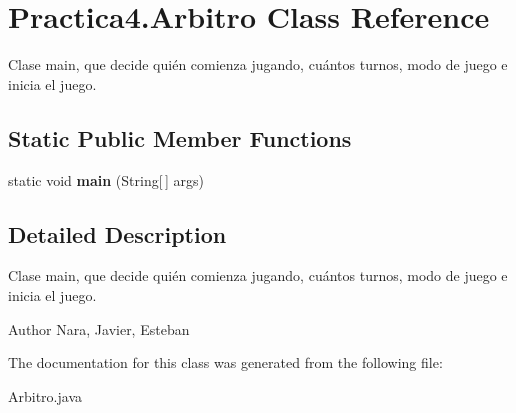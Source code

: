 \hypertarget{class_practica4_1_1_arbitro}{}\section{Practica4.\+Arbitro Class Reference}
\label{class_practica4_1_1_arbitro}


Clase main, que decide quién comienza jugando, cuántos turnos, modo de juego e inicia el juego.  


\subsection*{Static Public Member Functions}
\begin{DoxyCompactItemize}
\item 
\hypertarget{class_practica4_1_1_arbitro_ab357066d6d94d3daedb4d19b13111f17}{}static void {\bfseries main} (String\mbox{[}$\,$\mbox{]} args)\label{class_practica4_1_1_arbitro_ab357066d6d94d3daedb4d19b13111f17}

\end{DoxyCompactItemize}


\subsection{Detailed Description}
Clase main, que decide quién comienza jugando, cuántos turnos, modo de juego e inicia el juego. 

\begin{DoxyAuthor}{Author}
Nara, Javier, Esteban 
\end{DoxyAuthor}


The documentation for this class was generated from the following file\+:\begin{DoxyCompactItemize}
\item 
Arbitro.\+java\end{DoxyCompactItemize}
